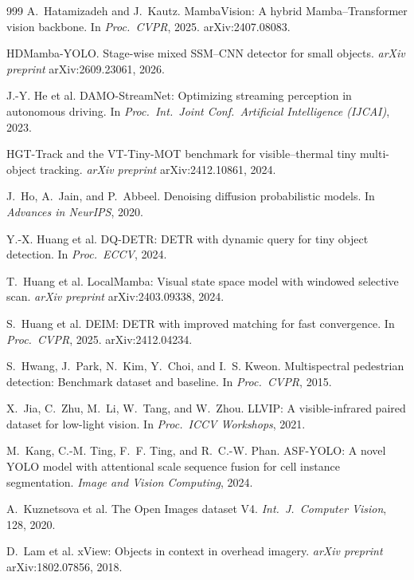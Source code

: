 \begin{thebibliography}{999}
A.~Hatamizadeh and J.~Kautz.
MambaVision: A hybrid Mamba--Transformer vision backbone.
In \textit{Proc.\ CVPR}, 2025. arXiv:2407.08083.

HDMamba-YOLO. Stage-wise mixed SSM--CNN detector for small objects.
\textit{arXiv preprint} arXiv:2609.23061, 2026.

J.-Y. He et al.
DAMO-StreamNet: Optimizing streaming perception in autonomous driving.
In \textit{Proc.\ Int.\ Joint Conf.\ Artificial Intelligence (IJCAI)}, 2023.

HGT-Track and the VT-Tiny-MOT benchmark for visible--thermal tiny multi-object
tracking. \textit{arXiv preprint} arXiv:2412.10861, 2024.

J.~Ho, A.~Jain, and P.~Abbeel.
Denoising diffusion probabilistic models.
In \textit{Advances in NeurIPS}, 2020.

Y.-X. Huang et al.
DQ-DETR: DETR with dynamic query for tiny object detection.
In \textit{Proc.\ ECCV}, 2024.

T.~Huang et al.
LocalMamba: Visual state space model with windowed selective scan.
\textit{arXiv preprint} arXiv:2403.09338, 2024.

S.~Huang et al.
DEIM: DETR with improved matching for fast convergence.
In \textit{Proc.\ CVPR}, 2025. arXiv:2412.04234.

S.~Hwang, J.~Park, N.~Kim, Y.~Choi, and I.~S. Kweon.
Multispectral pedestrian detection: Benchmark dataset and baseline.
In \textit{Proc.\ CVPR}, 2015.

X.~Jia, C.~Zhu, M.~Li, W.~Tang, and W.~Zhou.
LLVIP: A visible-infrared paired dataset for low-light vision.
In \textit{Proc.\ ICCV Workshops}, 2021.

M.~Kang, C.-M. Ting, F.~F. Ting, and R.~C.-W. Phan.
ASF-YOLO: A novel YOLO model with attentional scale sequence fusion for cell
instance segmentation. \textit{Image and Vision Computing}, 2024.

A.~Kuznetsova et al.
The Open Images dataset V4.
\textit{Int.\ J.\ Computer Vision}, 128, 2020.

D.~Lam et al.
xView: Objects in context in overhead imagery.
\textit{arXiv preprint} arXiv:1802.07856, 2018.


\end{thebibliography}
